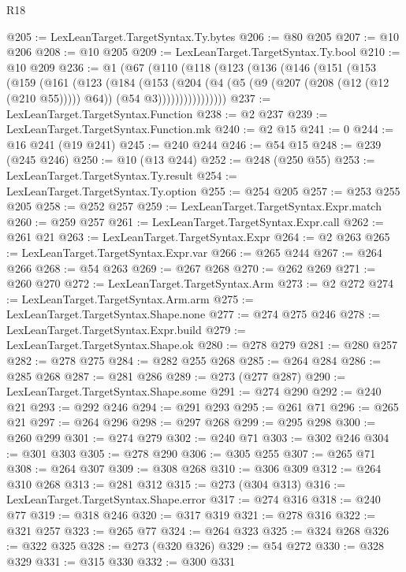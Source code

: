 \begin{lexlean}{R18}
\begin{coremodule}
{{{{{{{{{{{{{{{{{{{{{{{{{{{{{{{{{{{{{{{{{{{{{{{{{{{{{{{{{{{{{{{{{{{{{{{{{{{{{{{{{{{{{{{{{{{{{{{{{{{{{{{{{{{{{{{{{{{{{{{{{{{{@205 := LexLeanTarget.TargetSyntax.Ty.bytes
@206 := @80 @205
@207 := @10 @206
@208 := @10 @205
@209 := LexLeanTarget.TargetSyntax.Ty.bool
@210 := @10 @209
@236 := @1
    (@67
      (@110
        (@118
          (@123
            (@136
              (@146
                (@151
                  (@153
                    (@159
                      (@161
                        (@123
                          (@184
                            (@153
                              (@204
                                (@4
                                  (@5 (@9 (@207 (@208 (@12 (@12 (@210 @55))))) @64))
                                  (@54 @3))))))))))))))))
@237 := LexLeanTarget.TargetSyntax.Function
@238 := @2 @237
@239 := LexLeanTarget.TargetSyntax.Function.mk
@240 := @2 @15
@241 := 0
@244 := @16 @241 (@19 @241)
@245 := @240 @244
@246 := @54 @15
@248 := @239 (@245 @246)
@250 := @10 (@13 @244)
@252 := @248 (@250 @55)
@253 := LexLeanTarget.TargetSyntax.Ty.result
@254 := LexLeanTarget.TargetSyntax.Ty.option
@255 := @254 @205
@257 := @253 @255 @205
@258 := @252 @257
@259 := LexLeanTarget.TargetSyntax.Expr.match
@260 := @259 @257
@261 := LexLeanTarget.TargetSyntax.Expr.call
@262 := @261 @21
@263 := LexLeanTarget.TargetSyntax.Expr
@264 := @2 @263
@265 := LexLeanTarget.TargetSyntax.Expr.var
@266 := @265 @244
@267 := @264 @266
@268 := @54 @263
@269 := @267 @268
@270 := @262 @269
@271 := @260 @270
@272 := LexLeanTarget.TargetSyntax.Arm
@273 := @2 @272
@274 := LexLeanTarget.TargetSyntax.Arm.arm
@275 := LexLeanTarget.TargetSyntax.Shape.none
@277 := @274 @275 @246
@278 := LexLeanTarget.TargetSyntax.Expr.build
@279 := LexLeanTarget.TargetSyntax.Shape.ok
@280 := @278 @279
@281 := @280 @257
@282 := @278 @275
@284 := @282 @255 @268
@285 := @264 @284
@286 := @285 @268
@287 := @281 @286
@289 := @273 (@277 @287)
@290 := LexLeanTarget.TargetSyntax.Shape.some
@291 := @274 @290
@292 := @240 @21
@293 := @292 @246
@294 := @291 @293
@295 := @261 @71
@296 := @265 @21
@297 := @264 @296
@298 := @297 @268
@299 := @295 @298
@300 := @260 @299
@301 := @274 @279
@302 := @240 @71
@303 := @302 @246
@304 := @301 @303
@305 := @278 @290
@306 := @305 @255
@307 := @265 @71
@308 := @264 @307
@309 := @308 @268
@310 := @306 @309
@312 := @264 @310 @268
@313 := @281 @312
@315 := @273 (@304 @313)
@316 := LexLeanTarget.TargetSyntax.Shape.error
@317 := @274 @316
@318 := @240 @77
@319 := @318 @246
@320 := @317 @319
@321 := @278 @316
@322 := @321 @257
@323 := @265 @77
@324 := @264 @323
@325 := @324 @268
@326 := @322 @325
@328 := @273 (@320 @326)
@329 := @54 @272
@330 := @328 @329
@331 := @315 @330
@332 := @300 @331
}}}}}}}}}}}}}}}}}}}}}}}}}}}}}}}}}}}}}}}}}}}}}}}}}}}}}}}}}}}}}}}}}}}}}}}}}}}}}}}}}}}}}}}}}}}}}}}}}}}}}}}}}}}}}}}}}}}}}}}}}}}}
\end{coremodule}
\end{lexlean}
